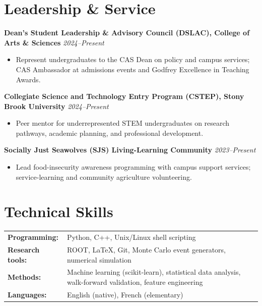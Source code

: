\documentclass[11pt,letterpaper]{article}
\newcommand{\lineitem}[2]{%
  \textbf{#1} \hfill \textit{#2}\\[-2pt]
}
\newcommand{\cvitem}[1]{\item #1}
\begin{document}
\section{Leadership \& Service}

\lineitem{Dean's Student Leadership \& Advisory Council (DSLAC), College of Arts \& Sciences}{2024--Present}
\begin{itemize}[leftmargin=*, nosep, topsep=2pt]
  \cvitem{Represent undergraduates to the CAS Dean on policy and campus services; CAS Ambassador at admissions events and Godfrey Excellence in Teaching Awards.}
\end{itemize}

\lineitem{Collegiate Science and Technology Entry Program (CSTEP), Stony Brook University}{2024--Present}
\begin{itemize}[leftmargin=*, nosep, topsep=2pt]
  \cvitem{Peer mentor for underrepresented STEM undergraduates on research pathways, academic planning, and professional development.}
\end{itemize}

\lineitem{Socially Just Seawolves (SJS) Living-Learning Community}{2023--Present}
\begin{itemize}[leftmargin=*, nosep, topsep=2pt]
  \cvitem{Lead food-insecurity awareness programming with campus support services; service-learning and community agriculture volunteering.}
\end{itemize}

\section{Technical Skills}
\begin{tabularx}{\textwidth}{@{}>{\bfseries}l X@{}}
Programming: & Python, C++, Unix/Linux shell scripting \\
Research tools: & ROOT, LaTeX, Git, Monte Carlo event generators, numerical simulation \\
Methods: & Machine learning (scikit-learn), statistical data analysis, walk-forward validation, feature engineering \\
Languages: & English (native), French (elementary)
\end{tabularx}
\end{document}
